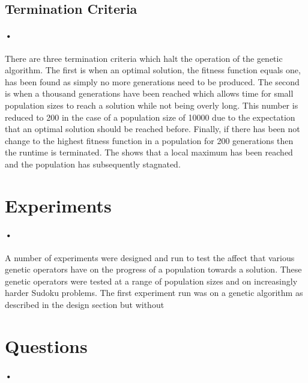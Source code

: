 \documentclass[10pt]{article}
\begin{document}
\subsection{Termination Criteria}
\paragraph{•}
There are three termination criteria which halt the operation of the genetic algorithm. The first is when an optimal solution, the fitness function equals one, has been found as simply no more generations need to be produced. The second is when a thousand generations have been reached which allows time for small population sizes to reach a solution while not being overly long. This number is reduced to 200 in the case of a population size of 10000 due to the expectation that an optimal solution should be reached before. Finally, if there has been not change to the highest fitness function in a population for 200 generations then the runtime is terminated. The shows that a local maximum has been reached and the population has subsequently stagnated.

\section{Experiments}
\paragraph{•}
A number of experiments were designed and run to test the affect that various genetic operators have on the progress of a population towards a solution. These genetic operators were tested at a range of population sizes and on increasingly harder Sudoku problems. The first experiment run was on a genetic algorithm as described in the design section but without 
\section{Questions}
\paragraph{•}
\end{document}
